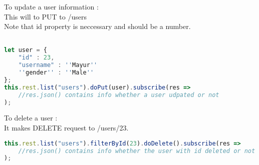 To update a user information : \\
This will to PUT to /users \\
Note that id property is neccessary and should be a number.
\begin{lstlisting}[language=Typescript]

let user = {
	"id" : 23,
	"username" : ''Mayur''
	''gender'' : ''Male''
};
this.rest.list("users").doPut(user).subscribe(res => 
	//res.json() contains info whether a user udpated or not
);
\end{lstlisting}


To delete a user : \\
It makes DELETE request to /users/23.
 \begin{lstlisting}[language=Typescript]
this.rest.list("users").filterById(23).doDelete().subscribe(res => 
	//res.json() contains info whether the user with id deleted or not
);
\end{lstlisting}

















